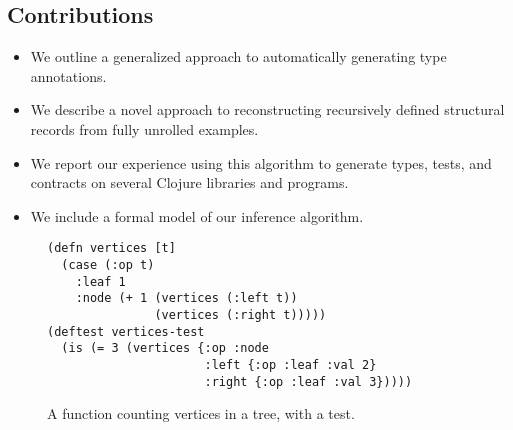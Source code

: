 \subsection*{Contributions}
\begin{itemize}
\item We outline a generalized approach to automatically
    generating type annotations.
\item
  We describe a novel approach to reconstructing recursively
  defined structural records from fully unrolled examples.
\item
  We report our experience using this algorithm to generate
  types, tests, and contracts on several
  Clojure libraries and programs.
\item
  We include a formal model of our inference algorithm.
\end{itemize}

\begin{figure}
\begin{Verbatim}
(defn vertices [t]
  (case (:op t)
    :leaf 1
    :node (+ 1 (vertices (:left t))
               (vertices (:right t)))))
(deftest vertices-test
  (is (= 3 (vertices {:op :node 
                      :left {:op :leaf :val 2}
                      :right {:op :leaf :val 3}))))
\end{Verbatim}
\caption{A function counting vertices in a tree,
with a test.}
\label{vertices}
\end{figure}
